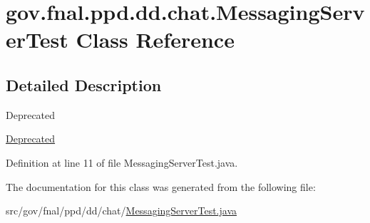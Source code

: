\hypertarget{classgov_1_1fnal_1_1ppd_1_1dd_1_1chat_1_1MessagingServerTest}{\section{gov.\-fnal.\-ppd.\-dd.\-chat.\-Messaging\-Server\-Test Class Reference}
\label{classgov_1_1fnal_1_1ppd_1_1dd_1_1chat_1_1MessagingServerTest}
}


\subsection{Detailed Description}
\begin{DoxyRefDesc}{Deprecated}
\item[\hyperlink{deprecated__deprecated000002}{Deprecated}]\end{DoxyRefDesc}


Definition at line 11 of file Messaging\-Server\-Test.\-java.



The documentation for this class was generated from the following file\-:\begin{DoxyCompactItemize}
\item 
src/gov/fnal/ppd/dd/chat/\hyperlink{MessagingServerTest_8java}{Messaging\-Server\-Test.\-java}\end{DoxyCompactItemize}
